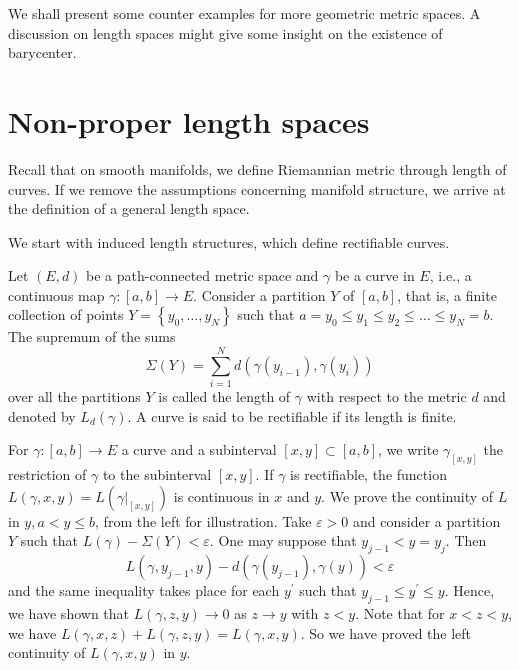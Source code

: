 We shall present some counter examples for more geometric metric spaces.
A discussion on length spaces might give some insight on the existence of barycenter.

\section{Non-proper length spaces}

Recall that on smooth manifolds, we define Riemannian metric through length of curves.
If we remove the assumptions concerning manifold structure,
we arrive at the definition of a general length space.

We start with induced length structures, which define rectifiable curves.
\begin{defn}
	\label{defn:length_structure}
	Let \( ( E , d ) \) be a path-connected metric space and \( \gamma \) be a curve in \( E \),
	i.e., a continuous map \( \gamma: [ a , b ] \rightarrow E \).
	Consider a partition \( Y \) of \( [ a , b ] \), that is,
	a finite collection of points \( Y = \left\{ y _ { 0 } , \ldots , y _ { N } \right\} \)
	such that \( a = y _ { 0 } \leq y _ { 1 } \leq y _ { 2 } \leq \ldots \leq y _ { N } = b \).
	The supremum of the sums
	\[
		\Sigma ( Y ) = \sum _ { i = 1 } ^ { N } d \left( \gamma \left( y _ { i - 1 } \right) , \gamma \left( y _ { i } \right) \right)
	\]
	over all the partitions $Y$ is called the length of $\gamma$
	with respect to the metric $d$ and denoted by $L_d (\gamma)$.
	A curve is said to be rectifiable if its length is finite.
\end{defn}

\begin{rmk}
	\label{rmk:curve_continuity_endpoints}
	For $\gamma : [a, b] \rightarrow E$ a curve and a subinterval $[x , y] \subset [a,b]$,
	we write $\gamma_{[x , y]}$ the restriction of $\gamma$ to the subinterval $[x , y]$.
	If \( \gamma \) is rectifiable,
	the function $ L ( \gamma , x , y ) = L \left( \gamma | _ { [ x , y ] } \right)$ is continuous
	in \( x \) and \( y \).
	We prove the continuity of \( L \) in \( y , a < y \leq b \),
	from the left for illustration.
	Take \( \varepsilon > 0 \) and
	consider a partition \( Y \) such that \( L ( \gamma ) - \Sigma ( Y ) < \varepsilon \). One may suppose that
	\( y _ { j - 1 } < y = y _ { j } \). Then
	\[
		L \left( \gamma , y _ { j - 1 } , y \right) - d \left( \gamma \left( y _ { j - 1 } \right) , \gamma ( y ) \right) < \varepsilon
	\]
	and the same inequality takes place for each $y^\prime$ such that $y_{j-1} \leq y^\prime \leq y$.
	Hence, we have shown that $L(\gamma, z, y) \rightarrow 0$ as $z \rightarrow y$ with $z<y$.
	Note that for $x < z <y$, we have
	$L(\gamma, x, z) + L(\gamma, z, y) = L(\gamma, x, y)$.
	So we have proved the left continuity of $L(\gamma, x,y)$ in $y$.
\end{rmk}

